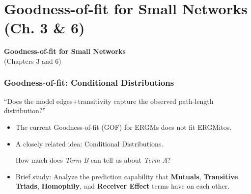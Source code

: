 \documentclass[aspectratio=169, 9pt]{beamer}
\begin{document}
\section{Goodness-of-fit for Small Networks (Ch. 3 \& 6)}

\begin{frame}[t]
\textcolor{uscgold}{
\Large {\bf Goodness-of-fit for Small Networks}\\(\small Chapters 3 and 6\Large)
}
\end{frame}


\begin{frame}[c]
	\frametitle{Goodness-of-fit: Conditional Distributions}
	
	\begin{center}
	\begin{minipage}[m]{.6\linewidth}
		\centering\Large
		``Does the model edges+transitivity capture the observed path-length distribution?''
	\end{minipage}	
	\end{center}\pause
	
	\begin{itemize}
		\item The current Goodness-of-fit (GOF) for ERGMs does not fit ERGMitos.\pause
		\item A closely related idea: Conditional Distributions. \\
		\begin{center}
			\large \alert{How much does \textit{Term B} can tell us about \textit{Term A}?}
		\end{center}		
		\pause
		\item Brief study: Analyze the prediction capability that \textbf{Mutuals}, \textbf{Transitive Triads}, \textbf{Homophily}, and \textbf{Receiver Effect} terms have on each other.\pause
	\end{itemize}
	
\begin{figure}
	
	\centering
	\def\svgwidth{.6\linewidth}
	
	\label{fig:maxout-gof-chapter}
\end{figure}
\end{frame}
\end{document}
